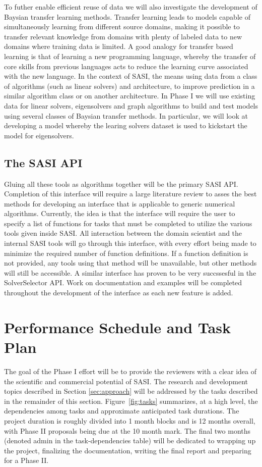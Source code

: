 To futher enable efficient reuse of data we will also investigate the development of Baysian transfer learning methods. Transfer learning leads to models capable of simultaneously learning from different source domains, making it possible to transfer relevant knowledge from domains with plenty of labeled data to new domains where training data is limited. A good analogy for transfer based learning is that of learning a new programming language, whereby the transfer of core skills from previous languages acts to reduce the learning curve associated with the new language. In the context of SASI, the means using data from a class of algorithms (such as linear solvers) and architecture,  to improve prediction in a similar algorithm class or on another architecture. In Phase I we will use existing data for linear solvers, eigensolvers and graph algorithms to build and test models using several classes of Baysian transfer methods. In particular, we will look at developing a model whereby the learing solvers dataset is used to kickstart the model for eigensolvers. 

\subsection{The SASI API} 
Gluing all these tools as algorithms together will be the primary SASI API. Completion of this interface will require a large literature review to asses the best methods for developing an interface that is applicable to generic numerical algorithms. Currently, the idea is that the interface will require the user to specify a list of functions for tasks that must be completed to utilize the various tools given inside SASI. All interaction between the domain scientist and the internal SASI tools will go through this interface, with every effort being made to minimize the required number of function definitions. If a function definition is not provided, any tools using that method will be unavailable, but other methods will still be accessible. A similar interface has proven to be very succssesful in the SolverSelector API. Work on documentation and examples will be completed throughout the development of the interface as each new feature is added. 
 
\section{Performance Schedule and Task Plan}
\label{sec:taskplan}

The goal of the Phase I effort will be to provide the reviewers with a clear idea 
of the scientific and commercial potential of SASI. The research and development topics 
described in Section \ref{sec:approach} will be addressed by the tasks described in the remainder of this section. 
Figure~\ref{fig:tasks} summarizes, at a high level, the dependencies among tasks 
and approximate anticipated task durations. The project duration is roughly 
divided into 1 month blocks and is 12 months overall, with Phase II proposals being due at the 10 month mark. The final two months (denoted admin in the task-dependencies table) will be dedicated to wrapping up the project, finalizing the documentation, writing the final 
report and preparing for a Phase II. 


